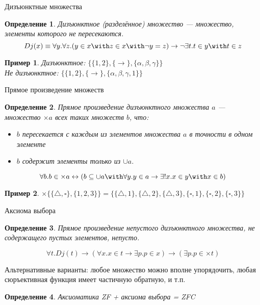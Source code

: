 \documentclass[aspectratio=169]{beamer}
\newtheorem{dfn}{Определение}[section]
\newtheorem{exm}{Пример}[section]
\begin{document}
\begin{frame}{Дизъюнктные множества}
\begin{dfn}Дизъюнктное (разделённое) множество --- множество, элементы которого
не пересекаются. 
$$Dj(x) \equiv \forall y.\forall z.(y \in x \with z \in x \with \neg y=z) \rightarrow 
\neg \exists t.t \in y \with t \in z$$
\end{dfn}\pause

\begin{exm}Дизъюнктное: $\{\{1,2\},\{\rightarrow\},\{\alpha,\beta,\gamma\}\}$\\ \pause
Не дизъюнктное: $\{\{1,2\},\{\rightarrow\},\{\alpha,\beta,\gamma,1\}\}$
\end{exm}
\end{frame}

\begin{frame}{Прямое произведение множеств}
\begin{dfn}Прямое произведение дизъюнктного множества $a$ --- 
множество $\times a$ всех таких множеств $b$, что:
\begin{itemize}
\item $b$ пересекается с каждым из элементов множества $a$ в точности в одном элементе
\item $b$ содержит элементы только из $\cup a$.
\end{itemize}

$$\forall b .b \in \times a \leftrightarrow (b \subseteq \cup a \with \forall y .y \in a \rightarrow \exists ! x .x \in y \with x \in b)$$
\end{dfn}\pause

\begin{exm}
$\times\{\{\triangle,\square\},\{1,2,3\}\} = \{\{\triangle,1\},\{\triangle,2\},\{\triangle,3\},\{\square,1\},\{\square,2\},\{\square,3\}\}$
\end{exm}

\end{frame}

\begin{frame}{Аксиома выбора}
\begin{dfn}
Прямое произведение непустого дизъюнктного множества, 
не содержащего пустых элементов, непусто.

$$\forall t.Dj (t) \rightarrow 
(\forall x.x \in t \rightarrow \exists p.p \in x) \rightarrow
(\exists p.p \in \times t)$$
\end{dfn}\pause

Альтернативные варианты: любое множество можно вполне упорядочить, \pause любая сюръективная функция имеет частичную обратную, 
и т.п.
\begin{dfn}Аксиоматика ZF + аксиома выбора = ZFC\end{dfn}\pause
\end{frame}
\end{document}
